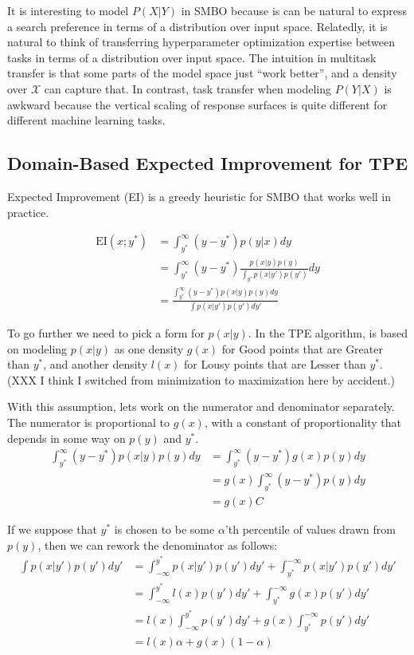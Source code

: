 \documentclass{article}
\begin{document}
    It is interesting to model $P(X|Y)$ in SMBO because is can be natural to express a search preference in terms of a distribution over input space.
    Relatedly, it is natural to think of transferring hyperparameter optimization expertise between tasks in terms of a distribution over input space.
    The intuition in multitask transfer is that some parts of the model space just ``work better'', and a density over $\mathcal{X}$ can capture that.
    In contrast, task transfer when modeling $P(Y|X)$ is awkward because the vertical scaling of response surfaces is quite different for different
    machine learning tasks.

\subsection{Domain-Based Expected Improvement for TPE}

    Expected Improvement (EI) is a greedy heuristic for SMBO that works well in practice.

    \begin{align}
        \mathrm{EI}(x; y^{*}) &= \int_{y^{*}}^{\infty} (y - y^{*})p(y|x) dy \\
        &= \int_{y^{*}}^{\infty} (y - y^{*})\frac{p(x|y)p(y)}{\int_{y'}p(x|y')p(y')} dy \\
        &= \frac{\int_{y^{*}}^{\infty} (y - y^{*})p(x|y)p(y) dy}{\int p(x|y')p(y') {dy'}}
    \end{align}

    To go further we need to pick a form for $p(x|y)$.
    In the TPE algorithm, is based on modeling
    $p(x|y)$ as one density $g(x)$ for Good points that are Greater than $y^*$, and
    another density $l(x)$ for Lousy points that are Lesser than $y^*$.
    (XXX I think I switched from minimization to maximization here by accident.)

    With this assumption, lets work on the numerator and denominator separately.
    The numerator is proportional to $g(x)$, with a constant of proportionality that depends in some way on $p(y)$ and $y^*$.
    \begin{align}
        \int_{y^{*}}^{\infty} (y - y^{*})p(x|y)p(y) dy
        &= \int_{y^{*}}^{\infty} (y - y^{*})g(x)p(y) dy \\
        &= g(x)\int_{y^{*}}^{\infty} (y - y^{*})p(y) dy \\
        &= g(x) C
    \end{align}

    If we suppose that $y^*$ is chosen to be some $\alpha$'th percentile of values drawn from $p(y)$, then we can rework the denominator as follows:
    \begin{align}
        \int p(x|y')p(y') {dy'}
        &= \int_{-\infty}^{y^*}p(x|y')p(y') dy' + \int_{y^*}^{-\infty}p(x|y')p(y') dy' \\
        &= \int_{-\infty}^{y^*}l(x)p(y') dy' + \int_{y^*}^{-\infty}g(x)p(y') dy' \\
        &= l(x)\int_{-\infty}^{y^*}p(y') dy' + g(x)\int_{y^*}^{-\infty}p(y') dy' \\
        &= l(x) \alpha + g(x)(1 - \alpha)
    \end{align}
\end{document}
